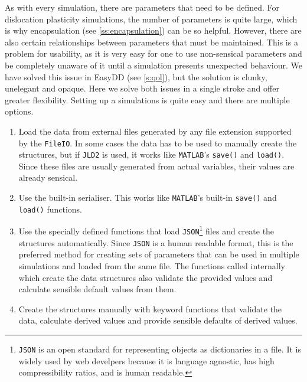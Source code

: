 As with every simulation, there are parameters that need to be defined. For dislocation plasticity simulations, the number of parameters is quite large, which is why encapsulation (see \cref{ss:encapsulation}) can be so helpful. However, there are also certain relationships between parameters that must be maintained. This is a problem for usability, as it is very easy for one to use non-sensical parameters and be completely unaware of it until a simulation presents unexpected behaviour. We have solved this issue in EasyDD (see \cref{s:qol}), but the solution is clunky, unelegant and opaque. Here we solve both issues in a single stroke and offer greater flexibility. Setting up a simulations is quite easy and there are multiple options.
\begin{enumerate}
    \item Load the data from external files generated by any file extension supported by the \texttt{FileIO}. In some cases the data has to be used to manually create the structures, but if \texttt{JLD2} is used, it works like \texttt{MATLAB}'s \texttt{save()} and \texttt{load()}. Since these files are usually generated from actual variables, their values are already sensical.
    \item Use the built-in serialiser. This works like \texttt{MATLAB}'s built-in \texttt{save()} and \texttt{load()} functions.
    \item Use the specially defined functions that load \texttt{JSON}\footnote{\texttt{JSON} is an open standard for representing objects as dictionaries in a file. It is widely used by web develpers because it is language agnostic, has high compressibility ratios, and is human readable.} files and create the structures automatically. Since \texttt{JSON} is a human readable format, this is the preferred method for creating sets of parameters that can be used in multiple simulations and loaded from the same file. The functions called internally which create the data structures also validate the provided values and calculate sensible default values from them.
    \item Create the structures manually with keyword functions that validate the data, calculate derived values and provide sensible defaults of derived values.
\end{enumerate}

